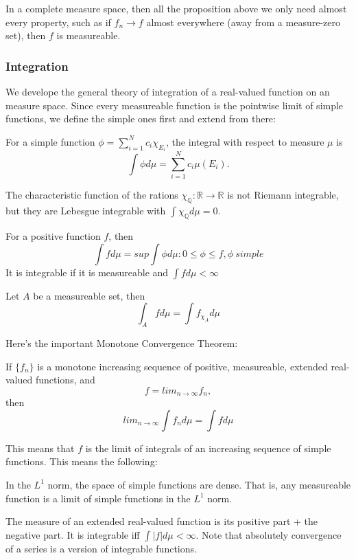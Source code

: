 \documentclass[main.tex]{subfiles}
\begin{document}
In a complete measure space, then all the proposition above we only need almost every property, such as if $f_n \rightarrow f$ almost everywhere (away from a measure-zero set), then $f$ is measureable.


\subsubsection{Integration}

We develope the general theory of integration of a real-valued function on an measure space. Since every measureable function is the pointwise limit of simple functions, we define the simple ones first and extend from there:

For a simple function $\phi = \sum_{i = 1} ^N c_i \chi_{E_i}$, the integral with respect to measure $\mu$ is 
$$
\int \phi d\mu = \sum_{i = 1} ^N c_i \mu(E_i).
$$

\begin{example}
The characteristic function of the rations $\chi_\mathbb{Q}: \mathbb{R} \rightarrow \mathbb{R}$ is not Riemann integrable, but they are Lebesgue integrable with $\int \chi_\mathbb{Q} d\mu = 0$.
\end{example}

For a positive function $f$, then 
$$
\int f d\mu = sup{\int \phi d\mu: 0 \leq \phi \leq f, \phi \ simple}
$$
It is integrable if it is measureable and $\int f d\mu < \infty$


Let $A$ be a measureable set, then 
$$
\int_A f d\mu = \int f_{\chi_A}d\mu
$$

Here's the important Monotone Convergence Theorem:

\begin{theorem}
If $\{f_n\}$ is a monotone increasing sequence of positive, measureable, extended real-valued functions, and 
$$
f = lim_{n\rightarrow \infty} f_n,
$$
then 
$$
lim_{n \rightarrow \infty} \int f_n d\mu = \int f d\mu
$$
\end{theorem}

This means that $f$ is the limit of integrals of an increasing sequence of simple functions. This means the following:

\begin{lemma}
In the $L^1$ norm, the space of simple functions are dense. That is, any measureable function is a limit of simple functions in the $L^1$ norm.
\end{lemma}

The measure of an extended real-valued function is its positive part  + the negative part.
It is integrable iff $\int |f| d\mu < \infty$. Note that absolutely convergence of a series is a version of integrable functions.
\end{document}
